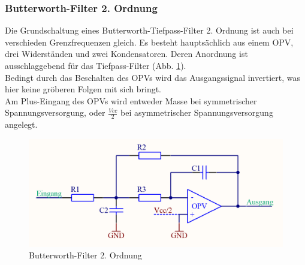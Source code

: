 \subsubsection{Butterworth-Filter 2. Ordnung}
Die Grundschaltung eines Butterworth-Tiefpass-Filter 2. Ordnung ist auch bei verschieden Grenzfrequenzen gleich. Es besteht hauptsächlich aus einem OPV, drei Widerständen und zwei Kondensatoren. Deren Anordnung ist ausschlaggebend für das Tiefpass-Filter (Abb. \ref{fig:abb3.1}).\\ 
Bedingt durch das Beschalten des OPVs wird das Ausgangssignal invertiert, was hier keine gröberen Folgen mit sich bringt.\\ 
Am Plus-Eingang des OPVs wird entweder Masse bei symmetrischer Spannungsversorgung, oder $\frac{Vcc}{2}$ bei asymmetrischer Spannungsversorgung angelegt.
\begin{figure} [h]
	\centering
	\caption{Butterworth-Filter 2. Ordnung}
	\label {fig:abb3.1}
	\includegraphics[width=1\textwidth]{img/TPFilterButterworth2Ordnung.PNG}
\end{figure}\\

